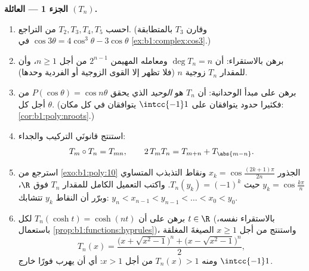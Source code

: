 \begin{problem}
\medskip
\noindent\textbf{الجزء 1 --- العائلة $(T_n)$.}
\begin{enumerate}
  \item احسب $T_2, T_3, T_4, T_5$ من التراجع. (وقارن
        $T_3$ بالمتطابقة $\cos3\theta = 4\cos^3\theta -
        3\cos\theta$ في \cref{ex:b1:complex:cos3}.)
  \item برهن بالاستقراء: أن $\deg T_n = n$ ومعامله المهيمن
        $2^{n-1}$ من أجل $n \geq 1$، وأن للمقدار $T_n$ زوجية
        $n$ (فلا تظهر إلا القوى الزوجية أو الفردية وحدها).
  \item برهن على مبدأ الوحدانية: أن $T_n$ هو 
        \emph{الوحيد} الذي يحقق $P(\cos\theta) = \cos n\theta$ من أجل
        كل $\theta$. (فكثيرا حدود يتوافقان على $\intcc{-1}1$
        يتوافقان في كل مكان: \cref{cor:b1:poly:nroots}.)
  \item استنتج قانونَي التركيب والجداء:
        \[
        T_m \circ T_n = T_{mn},
        \qquad
        2\,T_m T_n = T_{m+n} + T_{\abs{m-n}} .
        \]
  \item استرجع من \cref{exo:b1:poly:10} الجذور $x_k =
        \cos\frac{(2k+1)\pi}{2n}$ ونقاط التذبذب المتساوي
        $y_k = \cos\frac{k\pi}n$ حيث $T_n(y_k) = (-1)^k$. واكتب
        التعميل الكامل للمقدار $T_n$ فوق $\R$، وبرّر
        أن النقاط $y_k$ تتشابك: $y_n < x_{n-1} < y_{n-1}
        < \dots < x_0 < y_0$.
  \item برهن على أن $T_n(\cosh t) = \cosh(nt)$ لكل $t \in \R$
        (بالاستقراء نفسه، باستعمال
        \cref{prop:b1:functions:hyprules})، واستنتج من أجل $x
        \geq 1$ الصيغةَ المغلقة
        \[
        T_n(x) = \frac{\bigl(x + \sqrt{x^2 - 1}\bigr)^n +
        \bigl(x - \sqrt{x^2 - 1}\bigr)^n}{2} ,
        \]
        ومنه $T_n(x) > 1$ من أجل $x > 1$: أي أن  يهرب
        فورًا خارج $\intcc{-1}1$.
\end{enumerate}


\end{problem}
